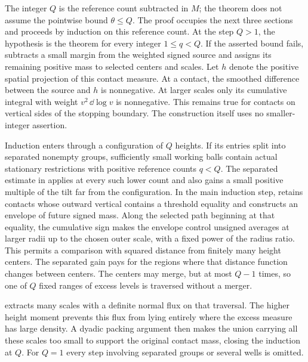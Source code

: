 The integer $Q$ is the reference count subtracted in $M$; the theorem
does not assume the pointwise bound $\theta\le Q$. The proof occupies the
next three sections and proceeds by induction on this reference count.
At the step $Q>1$, the hypothesis is the theorem for every integer
$1\le q<Q$.
If the asserted bound fails,  subtracts a small margin
from the weighted signed source and assigns its remaining positive mass
to selected centers and scales. Let $h$ denote the positive spatial
projection of this contact measure. At a contact, the smoothed difference
between the source and $h$ is nonnegative.
At larger scales only its cumulative integral with weight
$v^2\,\dd\log v$ is nonnegative. This remains true for contacts on
vertical sides of the stopping boundary. The construction itself uses
no smaller-integer assertion.

Induction enters through a configuration of $Q$ heights. If its entries
split into separated nonempty groups, sufficiently small working balls
contain actual stationary restrictions with positive reference counts
$q<Q$. The separated estimate in  applies
 at every such lower count and also gains a small positive
multiple of the tilt far from the configuration. In the main induction
step,  retains contacts whose outward vertical contains
a threshold equality and constructs an envelope of future signed mass.
Along the selected path beginning at that equality, the cumulative sign
makes the envelope control unsigned averages at larger radii up to the
chosen outer scale, with a fixed power of the radius ratio. This permits
a comparison with squared distance from finitely many height centers.
The separated gain pays for the regions where that distance function
changes between centers. The centers may merge, but at most $Q-1$ times,
so one of $Q$ fixed ranges of excess levels is traversed without a merger.

 extracts many scales with a definite normal flux on
that traversal. The higher height moment prevents this flux from lying
entirely where the excess measure has large density. A dyadic packing
argument then makes the union carrying all these scales too small to
support the original contact mass, closing the induction at $Q$.
For $Q=1$ every step involving separated groups or several wells is omitted.

